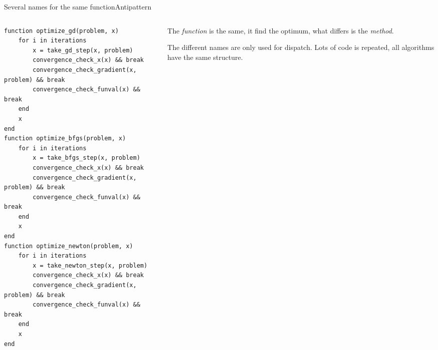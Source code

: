 \begin{frame}[fragile]{Several names for the same function}{Antipattern}
    \begin{columns}
 	\begin{column}{0.65\textwidth}

\begin{verbatim}
function optimize_gd(problem, x)
    for i in iterations
        x = take_gd_step(x, problem)
        convergence_check_x(x) && break
        convergence_check_gradient(x, problem) && break
        convergence_check_funval(x) && break
    end
    x
end
function optimize_bfgs(problem, x)
    for i in iterations
        x = take_bfgs_step(x, problem)
        convergence_check_x(x) && break
        convergence_check_gradient(x, problem) && break
        convergence_check_funval(x) && break
    end
    x
end
function optimize_newton(problem, x)
    for i in iterations
        x = take_newton_step(x, problem)
        convergence_check_x(x) && break
        convergence_check_gradient(x, problem) && break
        convergence_check_funval(x) && break
    end
    x
end
\end{verbatim}

\end{column}
\begin{column}{0.4\textwidth}
 The \emph{function} is the same, it find the optimum, what
differs is the \emph{method}.

\vspace{3mm}
The different names are only used for
dispatch. Lots of code is repeated, all algorithms have the same
structure.
\end{column}
\end{columns}

\end{frame}


